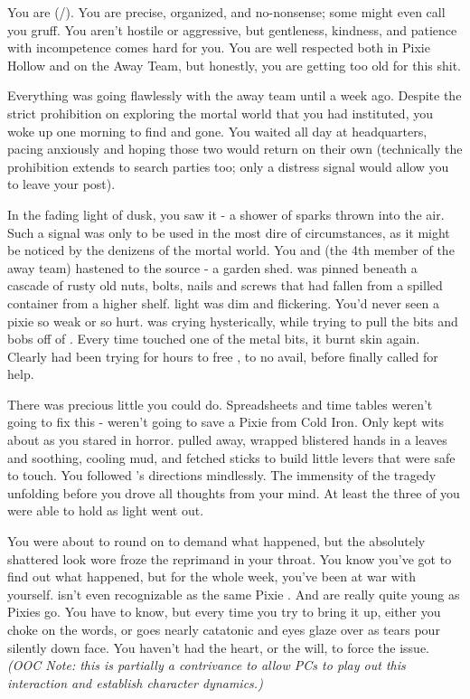 \documentclass[char]{PP}
\begin{document}
\name{\cSPM{}}

You are \cSPM{} (\cSPM{\They}/\cSPM{\Them}). You are precise, organized, and no-nonsense; some might even call you gruff. You aren't hostile or aggressive, but gentleness, kindness, and patience with incompetence comes hard for you. You are well respected both in Pixie Hollow and on the Away Team, but honestly, you are getting too old for this shit.

Everything was going flawlessly with the away team until a week ago. Despite the strict prohibition on exploring the mortal world that you had instituted, you woke up one morning to find \cFLost{} and \cMChange{} gone. You waited all day at headquarters, pacing anxiously and hoping those two would return on their own (technically the prohibition extends to search parties too; only a distress signal would allow you to leave your post).

In the fading light of dusk, you saw it - a shower of sparks thrown into the air. Such a signal was only to be used in the most dire of circumstances, as it might be noticed by the denizens of the mortal world. You and \cELove{} (the 4th member of the away team) hastened to the source - a garden shed. \cFLost{} was pinned beneath a cascade of rusty old nuts, bolts, nails and screws that had fallen from a spilled container from a higher shelf. \cFLost{\Their} light was dim and flickering. You'd never seen a pixie so weak or so hurt. \cMChange{} was crying hysterically, while trying to pull the bits and bobs off of \cFLost{}. Every time \cMChange{} touched one of the metal bits, it burnt \cMChange{\their} skin again. Clearly \cMChange{\they} had been trying for hours to free \cFLost{}, to no avail, before \cMChange{\they} finally called for help.

There was precious little you could do. Spreadsheets and time tables weren't going to fix this - weren't going to save a Pixie from Cold Iron. Only \cELove{} kept \cELove{\their} wits about \cELove{\them} as you stared in horror. \cELove{\They} pulled \cMChange{} away, wrapped \cMChange{\their} blistered hands in a leaves and soothing, cooling mud, and fetched sticks to build little levers that were safe to touch. You followed \cELove{}'s directions mindlessly. The immensity of the tragedy unfolding before you drove all thoughts from your mind. At least the three of you were able to hold \cFLost{} as \cFLost{\their} light went out.

You were about to round on \cMChange{} to demand what happened, but the absolutely shattered look \cMChange{\they} wore froze the reprimand in your throat. You know you've got to find out what happened, but for the whole week, you've been at war with yourself. \cMChange{} isn't even recognizable as the same Pixie \cMChange{\they} \cMChange{\were}. And \cMChange{\they} are really quite young as Pixies go. You have to know, but every time you try to bring it up, either you choke on the words, or \cMChange{} goes nearly catatonic and \cMChange{\their} eyes glaze over as tears pour silently down \cMChange{\their} face. You haven't had the heart, or the will, to force the issue. \textit{(OOC Note: this is partially a contrivance to allow PCs to play out this interaction and establish character dynamics.)}
\end{document}
